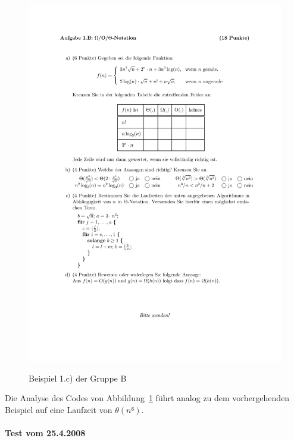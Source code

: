 \documentclass[a4paper, 12pt]{article}
\begin{document}
\begin{figure}[htbp]
	\caption{Beispiel 1.c) der Gruppe B}
	\vskip 0.2cm
	\centering
	\includegraphics{Figures/Test_2007-11-16_1Bc}
	\label{figure:Test_2007-11-16_1Bc}
\end{figure}

Die Analyse des Codes von Abbildung~\ref{figure:Test_2007-11-16_1Bc} führt analog zu dem vorhergehenden Beispiel auf eine Laufzeit von $θ\left(n⁶\right)$.

\paragraph{Test vom 25.4.2008}~\\
\end{document}
